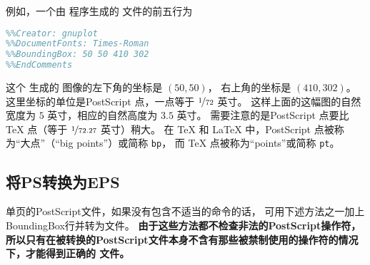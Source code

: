 例如，一个由  程序生成的  文件的前五行为

\begin{lstlisting}[language=PostScript]
%!PS-Adobe-2.0 EPSF-2.0
%%Creator: gnuplot
%%DocumentFonts: Times-Roman
%%BoundingBox: 50 50 410 302
%%EndComments
\end{lstlisting}

这个 生成的  图像的左下角的坐标是 $(50,50)$，
右上角的坐标是 $(410,302)$。
这里坐标的单位是PostScript 点，一点等于 $\nicefrac{1}{72}$ 英寸。
这样上面的这幅图的自然宽度为 $5$ 英寸，相应的自然高度为 $3.5$ 英寸。
需要注意的是PostScript 点要比 \TeX{} 点（等于 $\nicefrac{1}{72.27}$ 英寸）稍大。
在 \TeX{} 和 \LaTeX{} 中，PostScript 点被称为“大点”（``big points''）或简称 \texttt{bp}，
而 \TeX{} 点被称为``points''或简称 \texttt{pt}。

\subsection{将PS转换为EPS}\label{ssec:pstoeps}

单页的PostScript文件，如果没有包含不适当的命令的话，
可用下述方法之一加上BoundingBox行并转为文件。
\textbf{由于这些方法都不检查非法的PostScript操作符，
	所以只有在被转换的PostScript文件本身不含有那些被禁制使用的操作符的情况下，才能得到正确的 文件。}

